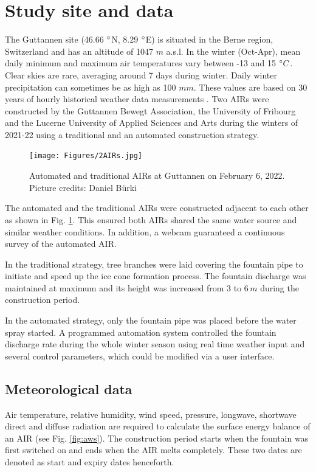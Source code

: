 \documentclass[tc, manuscript]{copernicus}
\begin{document}
\section{Study site and data}

The Guttannen site (46.66 $^{\circ}$N, 8.29 $^{\circ}$E) is situated in the Berne region, Switzerland and has an
altitude of 1047 $m$ a.s.l. In the winter (Oct-Apr), mean daily minimum and maximum air temperatures vary
between -13 and 15 $^{\circ} C$. Clear skies are rare, averaging around 7 days during winter. Daily winter
precipitation can sometimes be as high as 100 $mm$. These values are based on 30 years of hourly historical
weather data measurements \citep{meteoblueClimateGuttannen}. Two AIRs were constructed by the Guttannen Bewegt Association,
the University of Fribourg and the Lucerne University of Applied Sciences and Arts during the winters of 2021-22
using a traditional and an automated construction strategy.

\begin{figure}[t]
\texttt{[image: Figures/2AIRs.jpg]}
\caption{Automated and traditional AIRs  at Guttannen on February 6, 2022. Picture credits: Daniel Bürki}
\label{fig:2AIR} 
\end{figure}

The automated and the traditional AIRs were constructed adjacent to each other as shown in Fig. \ref{fig:2AIR}.
This ensured both AIRs shared the same water source and similar weather conditions. In addition, a webcam
guaranteed a continuous survey of the automated AIR.   

In the traditional strategy, tree branches were laid covering the fountain pipe to initiate and speed up the ice
cone formation process. The fountain discharge was maintained at maximum and its height was increased from 3 to
6\,$m$ during the construction period.

In the automated strategy, only the fountain pipe was placed before the water spray started. A programmed
automation system controlled the fountain discharge rate during the whole winter season using real time weather
input and several control parameters, which could be modified via a user interface. 

\subsection{Meteorological data}

Air temperature, relative humidity, wind speed, pressure, longwave, shortwave direct and diffuse radiation are
required to calculate the surface energy balance of an AIR (see Fig. \ref{fig:aws}). The construction period
starts when the fountain was first switched on and ends when the AIR melts completely. These two dates are denoted
as start and expiry dates henceforth.
\end{document}
